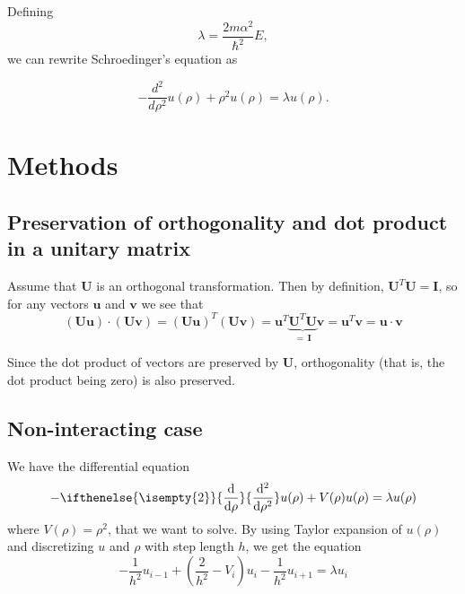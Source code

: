 \documentclass[11pt,a4paper]{article}
\newcommand\V[1]{\mathbf{#1}}                  %
\newcommand\df[3][]{{%
  \ifthenelse{\isempty{#1}}%
    {\frac{\mathrm{d}{#2}}{\mathrm{d}{#3}}}%
    {\frac{\mathrm{d}^{#1}{#2}}{{\mathrm{d}{#3}^{#1}}}}%
}}
\begin{document}
Defining
\begin{equation}
\lambda = \frac{2m\alpha^2}{\hbar^2}E,
\end{equation}
we can rewrite Schroedinger's equation as

\begin{equation}
  -\frac{d^2}{d\rho^2} u(\rho) + \rho^2u(\rho)  = \lambda u(\rho).
\end{equation}

\section{Methods}

\subsection{Preservation of orthogonality and dot product in a unitary matrix}

Assume that $\V{U}$ is an orthogonal transformation. Then by definition, $\V{U}^T \V{U} = \V{I}$,
so for any vectors $\V{u}$ and $\V{v}$ we see that
\begin{equation}
  \left( \V{U} \V{u} \right) \cdot \left( \V{U} \V{v} \right)
    = \left( \V{U} \V{u} \right)^T \left( \V{U} \V{v} \right)
    = \V{u}^T \underbrace{\V{U}^T \V{U}}_{= \, \V{I}} \V{v}
    = \V{u}^T \V{v} = \V{u} \cdot \V{v}
\end{equation}

Since the dot product of vectors are preserved by $\V{U}$, orthogonality (that is, the dot product
being zero) is also preserved.

\subsection{Non-interacting case}

We have the differential equation
\begin{equation}
  - \df[2]{}{\rho} u(\rho) + V(\rho) u(\rho) = \lambda u(\rho)
\end{equation}
where $V(\rho) = \rho^2$, that we want to solve. By using Taylor expansion of $u(\rho)$ and discretizing $u$ and $\rho$ with step length $h$, we
get the equation
\begin{equation}
  - \frac{1}{h^2} u_{i-1} + \left( \frac{2}{h^2} - V_i \right) u_i - \frac{1}{h^2} u_{i+1} = \lambda u_i
\end{equation}
\end{document}
